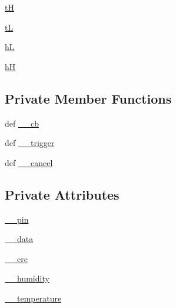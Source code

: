 \begin{DoxyCompactItemize}
\item 
\hyperlink{classlibsensorPy_1_1concretesensor_1_1dht22Humidity_1_1DHT22Humidity_aff7010a2f03223f59be15f00c96f15c4}{t\+H}
\item 
\hyperlink{classlibsensorPy_1_1concretesensor_1_1dht22Humidity_1_1DHT22Humidity_aeabec943e4cae663f674f52ad2a1e4b7}{t\+L}
\item 
\hyperlink{classlibsensorPy_1_1concretesensor_1_1dht22Humidity_1_1DHT22Humidity_a579b888747343e1260d5138441210f9f}{h\+L}
\item 
\hyperlink{classlibsensorPy_1_1concretesensor_1_1dht22Humidity_1_1DHT22Humidity_a1154501856699968b33382f930e51c07}{h\+H}
\end{DoxyCompactItemize}
\subsection*{Private Member Functions}
\begin{DoxyCompactItemize}
\item 
def \hyperlink{classlibsensorPy_1_1concretesensor_1_1dht22Humidity_1_1DHT22Humidity_af359b7046763e6c6cdd5d91fa8c4e704}{\+\_\+\+\_\+cb}
\item 
def \hyperlink{classlibsensorPy_1_1concretesensor_1_1dht22Humidity_1_1DHT22Humidity_a558b27d5d329994d12bad57d67343ff1}{\+\_\+\+\_\+trigger}
\item 
def \hyperlink{classlibsensorPy_1_1concretesensor_1_1dht22Humidity_1_1DHT22Humidity_a4c7fe0e355dec7a847438b14e3033045}{\+\_\+\+\_\+cancel}
\end{DoxyCompactItemize}
\subsection*{Private Attributes}
\begin{DoxyCompactItemize}
\item 
\hyperlink{classlibsensorPy_1_1concretesensor_1_1dht22Humidity_1_1DHT22Humidity_afb8517338a956c6f551b5422f407e748}{\+\_\+\+\_\+pin}
\item 
\hyperlink{classlibsensorPy_1_1concretesensor_1_1dht22Humidity_1_1DHT22Humidity_ab528526ad2cad083cb3f06e21c8e0d41}{\+\_\+\+\_\+data}
\item 
\hyperlink{classlibsensorPy_1_1concretesensor_1_1dht22Humidity_1_1DHT22Humidity_a5b5769a585534f794f2d47eb176b1eff}{\+\_\+\+\_\+crc}
\item 
\hyperlink{classlibsensorPy_1_1concretesensor_1_1dht22Humidity_1_1DHT22Humidity_a54709872f7b9772f8f4b0a4f71326092}{\+\_\+\+\_\+humidity}
\item 
\hyperlink{classlibsensorPy_1_1concretesensor_1_1dht22Humidity_1_1DHT22Humidity_aa7837fb8b48e7ff8043857f53996d96d}{\+\_\+\+\_\+temperature}
\end{DoxyCompactItemize}


